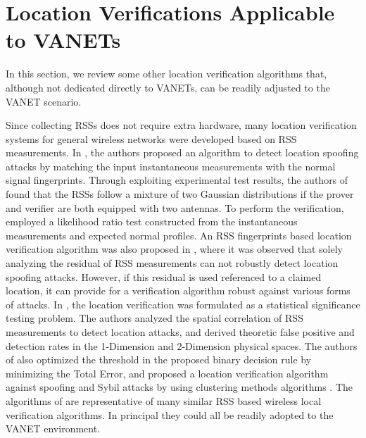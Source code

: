 \documentclass[journal]{IEEEtran}
\begin{document}
\section{Location Verifications Applicable to VANETs} \label{other}

In this section, we review some other location verification algorithms that, although not dedicated directly to VANETs,  can be readily adjusted to the VANET scenario.

Since collecting RSSs does not require extra hardware, many location verification systems for general wireless networks were developed based on RSS measurements. In \cite{faria2006detection}, the authors proposed an algorithm to detect location spoofing attacks by matching the input instantaneous measurements with the normal signal fingerprints. Through exploiting experimental test results, the authors of \cite{sheng2008detecting} found that the RSSs follow a mixture of two Gaussian distributions if the prover and verifier are both equipped with two antennas. To perform the verification, \cite{sheng2008detecting} employed a likelihood ratio test constructed from the instantaneous measurements and expected normal profiles. An RSS fingerprints based location verification algorithm was also proposed in \cite{malaney2007securing}, where it was observed that solely analyzing the residual of RSS measurements can not robustly detect location spoofing attacks. However, if this residual is used referenced to a claimed location, it can provide for a verification algorithm robust against various forms of attacks. In \cite{chen2010detecting}, the location verification was formulated as a statistical significance testing problem. The authors analyzed the spatial correlation of RSS measurements to detect location attacks, and derived theoretic false positive and detection rates in the 1-Dimension and 2-Dimension physical spaces. The authors of \cite{chen2010detecting} also optimized the threshold in the proposed binary decision rule by minimizing the Total Error, and proposed a location verification algorithm against spoofing and Sybil attacks  by using clustering methods algorithms \cite{hastie2001the}. The algorithms of \cite{faria2006detection} \cite{sheng2008detecting} \cite{chen2010detecting} \cite{malaney2007securing} are representative of many similar RSS based wireless local verification algorithms. In principal they could all be readily adopted to the VANET environment.
\end{document}
